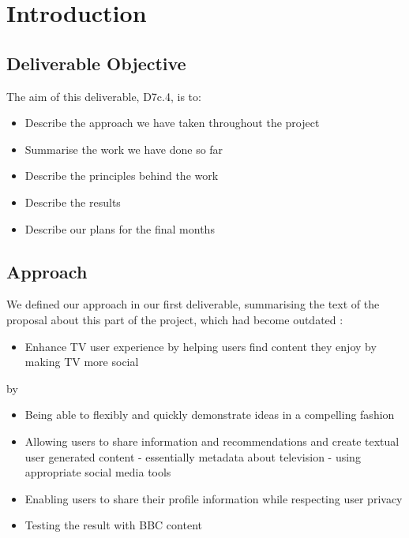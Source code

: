 \documentclass{notube}
\begin{document}
\maketitle

%

\chapter{Introduction}

\section{Deliverable Objective}

The aim of this deliverable, D7c.4, is to:
\begin{itemize}
\item{Describe the approach we have taken throughout the project}
\item{Summarise the work we have done so far}
\item{Describe the principles behind the work}
\item{Describe the results}
\item{Describe our plans for the final months}
\end{itemize}


\section{Approach}

We defined our approach in our first deliverable, summarising the text of the proposal about this part of the project, which had become outdated :

\begin{itemize}
\item{Enhance TV user experience by helping users find content they enjoy by making TV more social}
\end{itemize}

by

\begin{itemize}
\item{Being able to flexibly and quickly demonstrate ideas in a compelling fashion}
\item{Allowing users to share information and recommendations and create textual user generated content - essentially metadata about television - using appropriate social media tools}
\item{Enabling users to share their profile information while respecting user privacy}
\item{Testing the result with BBC content}
\end{itemize}
\end{document}
